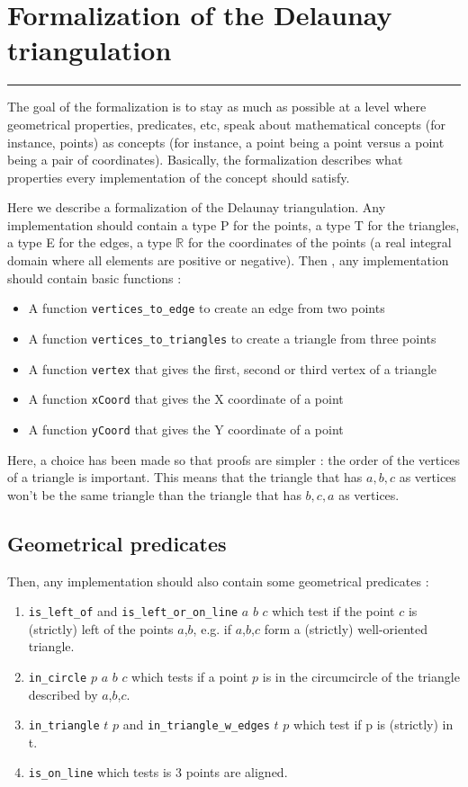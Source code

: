 \documentclass[a4paper,10pt]{article}
\begin{document}
\section{Formalization of the Delaunay triangulation}
\rule{\linewidth}{0.5pt}

The goal of the formalization is to stay as much as possible at a level where geometrical properties, predicates, etc, speak about mathematical concepts (for instance, points) as concepts (for instance, a point being a point versus a point being a pair of coordinates). Basically, the formalization describes what properties every implementation of the concept should satisfy.

Here we describe a formalization of the Delaunay triangulation. Any implementation should contain a type P for the points, a type T for the triangles, a type E for the edges, a type $\mathbb{R}$ for the coordinates of the points (a real integral domain where all elements are positive or negative).
Then , any implementation should contain basic functions :
\begin{itemize}
\item A function {\tt vertices\_to\_edge} to create an edge from two points
\item A function {\tt vertices\_to\_triangles} to create a triangle from three points
\item A function {\tt vertex}  that gives the first, second or third vertex of a triangle
\item A function {\tt xCoord} that gives the X coordinate of a point
\item A function {\tt yCoord} that gives the Y coordinate of a point
\end{itemize}

Here, a choice has been made so that proofs are simpler : the order of the vertices of a triangle is important. This means that the triangle that has $a,b,c$ as vertices won't be the same triangle than the triangle that has $b,c,a$ as vertices.

\subsection{Geometrical predicates}

Then, any implementation should also contain some geometrical predicates :
\begin{enumerate}
\item {\tt is\_left\_of} and {\tt is\_left\_or\_on\_line} $a$ $b$ $c$ which test if the point $c$ is (strictly) left of the points $a$,$b$, e.g. if $a$,$b$,$c$ form a (strictly) well-oriented triangle.
\item {\tt in\_circle} $p$ $a$ $b$ $c$ which tests if a point $p$ is in the circumcircle of the triangle described by $a$,$b$,$c$.
\item {\tt in\_triangle} $t$ $p$ and {\tt in\_triangle\_w\_edges} $t$ $p$ which test if p is (strictly) in t.
  \item {\tt is\_on\_line} which tests is 3 points are aligned.

\end{enumerate}
\end{document}
